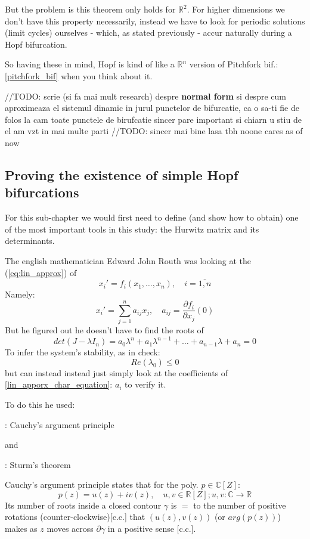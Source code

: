 But the problem is this theorem only holds for $\mathbb{R}^2$. For higher dimensions we don't have this property necessarily, instead we have to look for periodic solutions (limit cycles) ourselves - which, as stated previously - accur naturally during a Hopf bifurcation.

So having these in mind, Hopf is kind of like a $\mathbb{R}^n$ version of Pitchfork bif.: \ref{pitchfork_bif} when you think about it.

//TODO: scrie (si fa mai mult research) despre  \textbf{normal form} si despre cum aproximeaza el sistemul dinamic in jurul punctelor de bifurcatie, ca o sa-ti fie de folos la cam toate punctele de birufcatie sincer pare important si chiarn u stiu de el am vzt in mai multe parti
//TODO: sincer mai bine lasa tbh noone cares as of now

\subsection{Proving the existence of simple Hopf bifurcations}

For this sub-chapter we would first need to define (and show how to obtain) one of the most important tools in this study: the Hurwitz matrix and its determinants.

The english mathematician Edward John Routh was looking at the (\ref{eq:lin_approx}) of
\[
  x_i' = f_i(x_1,\dots , x_n), \quad i = \overline{1,n}
\]
Namely:
\[
  x_i' =\sum_{j=1}^{n}a_{ij} x_j, \quad a_{ij} = \frac{\partial f_i}{\partial x_j}(0)
\]
But he figured out he doesn't have to find the roots of
\begin{equation}\label{lin_apporx_char_equation}
  det(J - \lambda I_n) = a_0 \lambda^n + a_1 \lambda^{n-1} + \dots + a_{n-1}\lambda + a_n = 0
\end{equation}
To infer the system's stability, as in check:
\[
  Re(\lambda_0) \leq 0
\]
but can instead instead just simply look at the coefficients of \ref{lin_apporx_char_equation}: $a_{i}$ to verify it.

To do this he used:

: Cauchy's argument principle

and

: Sturm's theorem


Cauchy's argument principle states that for the poly. $p \in \mathbb{C}[Z]$:
\[
  p(z) = u(z) + i v(z), \quad u, v \in \mathbb{R}[Z]; u,v : \mathbb{C} \rightarrow \mathbb{R}
\]
Its number of roots inside a closed contour $\gamma$  is $=$ to the number of positive rotations (counter-clockwise)[c.c.] that $(u(z), v(z))$ (or $arg(p(z))$) makes as $z$ moves across $\partial \gamma$ in a positive sense [c.c.].


